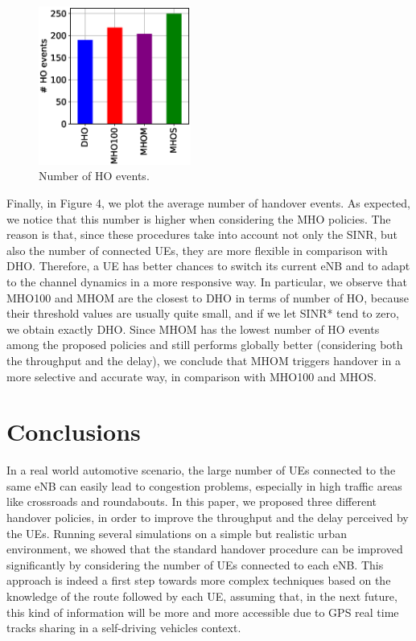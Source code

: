 \documentclass[conference,10pt]{IEEEtran}
\begin{document}
\begin{figure}[h]
	\vspace*{-6pt}
	\begin{center}    
		\includegraphics[width=5cm, keepaspectratio]{images/ho_events.eps}
	\end{center}
	\vspace*{-10pt}
	\caption{Number of HO events.}
	\vspace*{3pt}
\end{figure}

Finally, in Figure 4, we plot the average number of handover events. As expected, we notice that this number is higher when considering the MHO policies. The reason is that, since these procedures take into account not only the SINR, but also the number of connected UEs, they are more flexible in comparison with DHO. Therefore, a UE has better chances to switch its current eNB and to adapt to the channel dynamics in a more responsive way. In particular, we observe that MHO100 and MHOM are the closest to DHO in terms of number of HO, because their threshold values are usually quite small, and if we let SINR* tend to zero, we obtain exactly DHO. Since MHOM has the lowest number of HO events among the proposed policies and still performs globally better (considering both the throughput and the delay), we conclude that MHOM triggers handover in a more selective and accurate way, in comparison with MHO100 and MHOS.

\section{Conclusions}\label{sec:conclusion}

In a real world automotive scenario, the large number of UEs connected to the same eNB can easily lead to congestion problems, especially in high traffic areas like crossroads and roundabouts. In this paper, we proposed three different handover policies, in order to improve the throughput and the delay perceived by the UEs. Running several simulations on a simple but realistic urban environment, we showed that the standard handover procedure can be improved significantly by considering the number of UEs connected to each eNB. This approach is indeed a first step towards more complex techniques based on the knowledge of the route followed by each UE, assuming that, in the next future, this kind of information will be more and more accessible due to GPS real time tracks sharing in a self-driving vehicles context.
\end{document}
